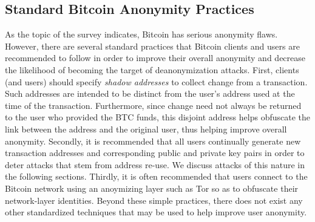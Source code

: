 \subsection{Standard Bitcoin Anonymity Practices}
As the topic of the survey indicates, Bitcoin has serious anonymity flaws. However, there are several standard practices that Bitcoin clients and users are recommended to follow in order to improve their overall anonymity and decrease the likelihood of becoming the target of deanonymization attacks. First, clients (and users) should specify \emph{shadow addresses} to collect change from a transaction. Such addresses are intended to be distinct from the user's address used at the time of the transaction. Furthermore, since change need not always be returned to the user who provided the BTC funds, this disjoint address helps obfuscate the link between the address and the original user, thus helping improve overall anonymity. Secondly, it is recommended that all users continually generate new transaction addresses and corresponding public and private key pairs in order to deter attacks that stem from address re-use. We discuss attacks of this nature in the following sections. Thirdly, it is often recommended that users connect to the Bitcoin network using an anoymizing layer such as Tor \cite{tor,bitcoin-tor-wiki} so as to obfuscate their network-layer identities. Beyond these simple practices, there does not exist any other standardized techniques that may be used to help improve user anonymity.

